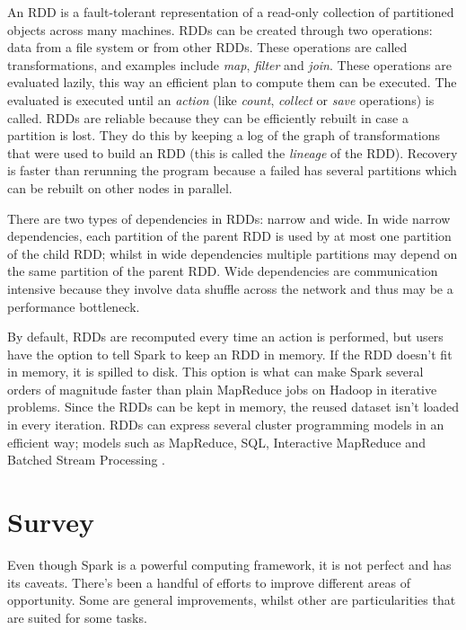 \documentclass{article}
\begin{document}
An RDD is a fault-tolerant representation of a read-only collection of partitioned objects across many machines. RDDs can be created through two operations: data from a file system or from other RDDs. These operations are called transformations, and examples include \textit{map}, \textit{filter} and \textit{join}. These operations are evaluated lazily, this way an efficient plan to compute them can be executed. The evaluated is executed until an \textit{action} (like \textit{count}, \textit{collect} or \textit{save} operations) is called. RDDs are reliable because they can be efficiently rebuilt in case a partition is lost. They do this by keeping a log of the graph of transformations that were used to build an RDD (this is called the \textit{lineage} of the RDD). Recovery is faster than rerunning the program because a failed has several partitions which can be rebuilt on other nodes in parallel.

There are two types of dependencies in RDDs: narrow and wide. In wide narrow dependencies, each partition of the parent RDD is used by at most one partition of the child RDD; whilst in wide dependencies multiple partitions may depend on the same partition of the parent RDD. Wide dependencies are communication intensive because they involve data shuffle across the network and thus may be a performance bottleneck.

By default, RDDs are recomputed every time an action is performed, but users have the option to tell Spark to keep an RDD in memory. If the RDD doesn't fit in memory, it is spilled to disk. This option is what can make Spark several orders of magnitude faster than plain MapReduce jobs on Hadoop in iterative problems. Since the RDDs can be kept in memory, the reused dataset isn't loaded in every iteration. RDDs can express several cluster programming models in an efficient way; models such as MapReduce, SQL, Interactive MapReduce and Batched Stream Processing \cite{zaharia_resilient_2012}.




\section{Survey}

Even though Spark is a powerful computing framework, it is not perfect and has its caveats. There's been a handful of efforts to improve different areas of opportunity. Some are general improvements, whilst other are particularities that are suited for some tasks.
\end{document}

